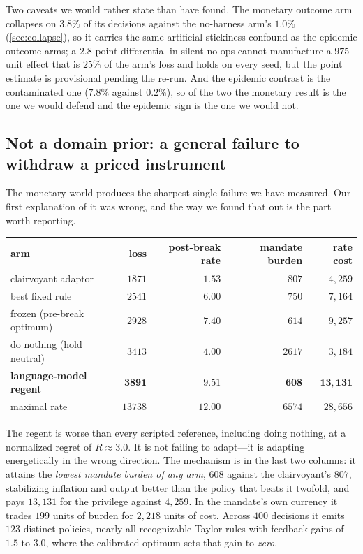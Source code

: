 \documentclass[11pt]{article}
\begin{document}
Two caveats we would rather state than have found. The monetary outcome arm collapses on $3.8\%$ of
its decisions against the no-harness arm's $1.0\%$ (\cref{sec:collapse}), so it carries the same
artificial-stickiness confound as the epidemic outcome arms; a $2.8$-point differential in silent
no-ops cannot manufacture a $975$-unit effect that is $25\%$ of the arm's loss and holds on every
seed, but the point estimate is provisional pending the re-run. And the epidemic contrast is the
contaminated one ($7.8\%$ against $0.2\%$), so of the two the monetary result is the one we would
defend and the epidemic sign is the one we would not.

\subsection{Not a domain prior: a general failure to withdraw a priced instrument}
\label{sec:priors}

The monetary world produces the sharpest single failure we have measured. Our first explanation of
it was wrong, and the way we found that out is the part worth reporting.

\begin{center}\small
\begin{tabular}{@{}lrrrr@{}}
\toprule
arm & loss & post-break rate & mandate burden & rate cost \\
\midrule
clairvoyant adaptor & $1871$ & $\mathbf{1.53}$ & $807$ & $4{,}259$ \\
best fixed rule & $2541$ & $6.00$ & $750$ & $7{,}164$ \\
frozen (pre-break optimum) & $2928$ & $7.40$ & $614$ & $9{,}257$ \\
do nothing (hold neutral) & $3413$ & $4.00$ & $2617$ & $3{,}184$ \\
\textbf{language-model regent} & $\mathbf{3891}$ & $\mathbf{9.51}$ & $\mathbf{608}$ & $\mathbf{13{,}131}$ \\
maximal rate & $13738$ & $12.00$ & $6574$ & $28{,}656$ \\
\bottomrule
\end{tabular}
\end{center}

The regent is worse than every scripted reference, including doing nothing, at a normalized regret of
$R \approx 3.0$. It is not failing to adapt---it is adapting energetically in the wrong direction.
The mechanism is in the last two columns: it attains the \emph{lowest mandate burden of any arm},
$608$ against the clairvoyant's $807$, stabilizing inflation and output better than the policy that
beats it twofold, and pays $13{,}131$ for the privilege against $4{,}259$. In the mandate's own
currency it trades $199$ units of burden for $2{,}218$ units of cost. Across $400$ decisions it emits
$123$ distinct policies, nearly all recognizable Taylor rules with feedback gains of $1.5$ to $3.0$,
where the calibrated optimum sets that gain to \emph{zero}.
\end{document}
